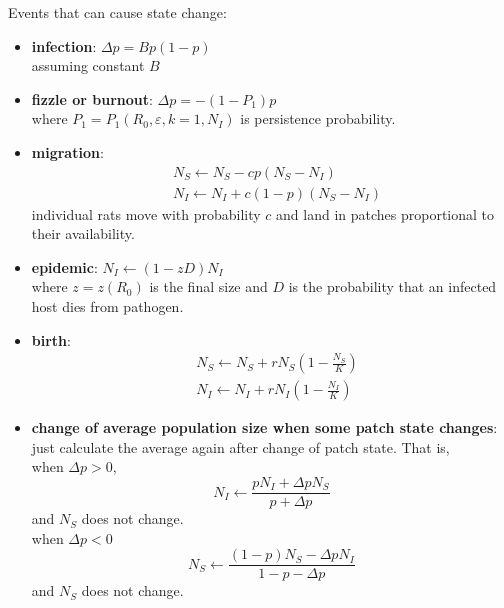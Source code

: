 \documentclass[12pt]{article}
\begin{document}
Events that can cause state change:
\begin{itemize}
    \item \textbf{infection}: $\Delta p=Bp(1-p)$\\
 assuming constant $B$ 
    \item \textbf{fizzle or burnout}: $\Delta p=-(1-P_1)p$\\
    where $P_1=P_1(R_0,\varepsilon,k=1,N_I)$ is persistence probability. 
    \item \textbf{migration}:
    \begin{align*}
       & N_S \leftarrow N_S-cp(N_S-N_I)\\
       & N_I \leftarrow N_I+c(1-p)(N_S-N_I)
    \end{align*}
individual rats move with probability $c$ and land in patches proportional to their availability.

    \item \textbf{epidemic}: $N_I \leftarrow (1-zD)N_I $\\
    where $z=z(R_0)$ is the final size and $D$ is the probability that an infected host dies from pathogen. 
    \item \textbf{birth}:
    \begin{align*}        
        &N_S \leftarrow N_S + rN_S(1-\frac{N_S}{K})\\
        &N_I \leftarrow N_I+ rN_I(1-\frac{N_I}{K})       
    \end{align*}
    \item \textbf{change of average population size when some patch state changes}: just calculate the average again after change of patch state. That is,\\

        when $\Delta p > 0$,
       $$ N_I\leftarrow\frac{pN_I+\Delta p N_S}{p+\Delta p}$$
       and $N_S$ does not change.\\

        when $\Delta p<0 $
        $$N_S\leftarrow\frac{(1-p)N_S-\Delta p N_I}{1-p-\Delta p}$$
       and $N_S$ does not change. 
\end{itemize}
\end{document}
